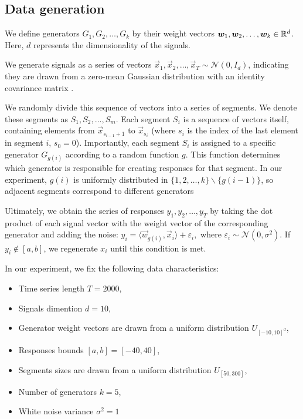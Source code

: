 \documentclass[12pt, twoside]{article}
\begin{document}
\subsection{Data generation}

We define generators $G_1, G_2, \dots, G_k$ by their weight vectors $\boldsymbol{w}_1, \boldsymbol{w}_2, \dots, \boldsymbol{w}_k \in \mathbb{R}^d$. 
Here, $d$ represents the dimensionality of the signals.

We generate signals as a series of vectors $\vec x_1, \vec x_2, \dots, \vec x_T \sim \mathcal{N}(0, I_d)$, indicating they are drawn from a zero-mean Gaussian distribution with an identity covariance matrix .

We randomly divide this sequence of vectors into a series of segments.
We denote these segments as $S_1, S_2, \dots, S_m$. 
Each segment $S_i$ is a sequence of vectors itself, containing elements from $\vec x_{s_{i-1}+1}$ to $\vec x_{s_i}$ (where $s_i$ is the index of the last element in segment $i$, $s_0 = 0$). 
Importantly, each segment $S_i$ is assigned to a specific generator $G_{g(i)}$ according to a random function $g$. 
This function determines which generator is responsible for creating responses for that segment. In our experiment, $g(i)$ is uniformly distributed in $\{1, 2, \dots, k\} \backslash \{g(i-1)\}$, so adjacent segments correspond to different generators 

Ultimately, we obtain the series of responses $y_1, y_2, \dots, y_T$ by taking the dot product of each signal vector with the weight vector of the corresponding  generator and adding the noise: $y_i = \langle \vec w_{g(i)}, \vec x_i \rangle + \varepsilon_i,$ where $\varepsilon_i \sim \mathcal{N}(0, \sigma^2)$. If $y_i  \notin [a, b]$, we regenerate $x_i$ until this condition is met.
\vspace{2mm}

In our experiment, we fix the following data characteristics:
\begin{itemize}
\item Time series length $T = 2000$,
\item Signals dimention $d=10$,
\item Generator weight vectors are drawn from a uniform distribution $U_{[-10, 10]^d}$,
\item Responses bounds $[a, b] = [-40, 40]$,
\item Segments sizes are drawn from a uniform distribution $U_{[50, 300]}$,
\item Number of generators $k = 5$,
\item White noise variance $\sigma^2= 1$
\end{itemize}
\end{document}
